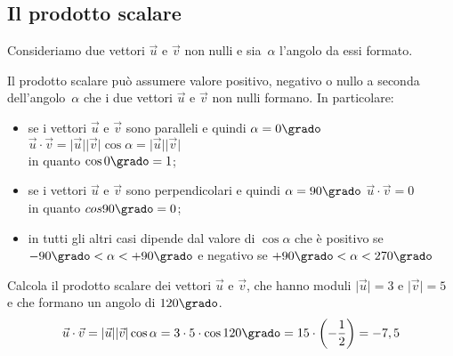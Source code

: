 \subsection{Il prodotto scalare}
\begin{minipage}{.59 \textwidth}
Consideriamo due vettori \(\vec{u}\) e \(\vec{v}\) 
non nulli e sia~\(\alpha\) l'angolo da essi formato.
\end{minipage}
\hfill
\begin{minipage}{.59 \textwidth}
\begin{inaccessibleblock}
 \begin{center}
  
 \end{center}
\end{inaccessibleblock}
\end{minipage}

Il prodotto scalare può assumere valore positivo, negativo o nullo a seconda 
dell'angolo~\(\alpha\) che i due vettori \(\vec{u}\) e \(\vec{v}\) non nulli formano. 
In particolare:
\begin{itemize} [noitemsep]
 \item se i vettori \(\vec{u}\) e \(\vec{v}\) sono paralleli e 
  quindi \(\alpha=0\grado\)
  \(\vec{u} \cdot \vec{v} = 
    \lvert\vec{u}\rvert\lvert\vec{v}\rvert \cos \alpha = 
    \lvert\vec{u}\rvert\lvert\vec{v}\rvert\) \\
  in quanto \(\cos 0\grado = 1\);
 \item se i vettori \(\vec{u}\) e \(\vec{v}\) sono perpendicolari e 
  quindi \(\alpha=90\grado\)
  \(\vec{u} \cdot \vec{v} = 0\) \\ 
  in quanto \(cos 90\grado = 0\);
 \item in tutti gli altri casi dipende dal valore di \(\cos \alpha\) che è 
  positivo se \(-90\grado < \alpha < +90\grado\) e negativo 
  se \(+90\grado < \alpha < 270\grado\)
\end{itemize}

 \begin{esempio}
  Calcola il prodotto scalare dei  vettori \(\vec{u}\) e \(\vec{v}\), 
  che hanno moduli \(\lvert\vec{u}\rvert= 3 \text{ e } \lvert\vec{v}\rvert=5\) 
  e che formano un angolo di \(120\grado\).
  \[\vec{u} \cdot \vec{v} = 
    \lvert\vec{u}\rvert\lvert\vec{v}\rvert \cos \alpha=
    3 \cdot 5 \cdot \cos 120\grado = 15 \cdot \left(-\frac{1}{2} \right)=
    -7,5\]
 \end{esempio}

